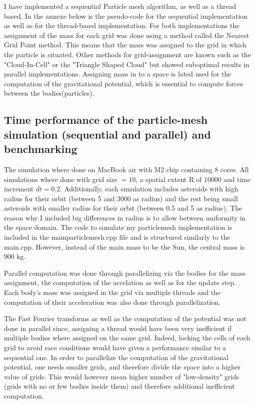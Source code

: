 \documentclass{article}
\begin{document}
I have implemented a sequential Particle mesh algorithm, as well as a thread based. 
In the annexe below is the pseudo-code for the sequential implementation as well as for the thread-based implementation. 
For both implementations the assignment of the mass for each grid was done using a method called the Nearest Grid Point method. This means that the mass was assigned to the grid in which the particle is situated. Other methods for grid-assignment are known such as the "Cloud-In-Cell" or the "Triangle Shaped Cloud" but showed suboptimal results in parallel implementations. 
Assigning mass in to a space is lated used for the computation of the gravitational potential, which is essential to compute forces between the bodies(particles).
\subsection{Time performance of the particle-mesh simulation (sequential and parallel) and benchmarking}
The simulation where done on MacBook air with M2 chip containing 8 cores.
All simulations where done with grid size $= 10$, a spatial extent R of $10 000$ and time increment $dt = 0.2$. Additionally, each simulation includes asteroids with high radius for their orbit (between 5 and 3000  as radius)  and the rest being small asteroids with smaller radius for their orbit (between 0.5 and 5 as radius). 
The reason why I included big differences in radius is to allow between uniformity in the space domain. 
The code to simulate my particlemesh implementation is included in the mainparticlemesh.cpp file and is structured similarly to the main.cpp.
However, instead of the main mass to be the Sun, the central mass is 900 kg. 

Parallel computation was done through parallelizing via the bodies for the mass assignment, the computation of the accelation as well as for the update step. Each body's mass was assigned in the grid via multiple threads and the computation of their acceleration was also done through parallelization. 

The Fast Fourier transforms as well as the computation of the potential was not done in parallel since, assigning a thread would have been very inefficient if multiple bodies where assigned on the same grid. Indeed, locking the cells of each grid to avoid race conditions would have given a performance similar to a sequential one. In order to parallelize the computation of the gravitational potential, one needs smaller grids, and therefore divide the space into a higher value of grids. This would however mean higher number of "low-density" grids (grids with no or few bodies inside them) and therefore additional inefficient computation. 
\end{document}
